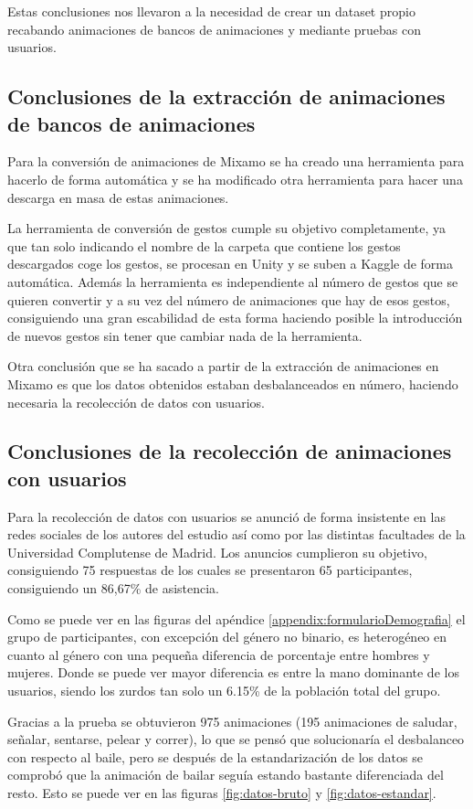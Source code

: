 Estas conclusiones nos llevaron a la necesidad de crear un dataset propio recabando animaciones de bancos de animaciones y mediante pruebas con usuarios.

\subsection{Conclusiones de la extracción de animaciones de bancos de animaciones}
Para la conversión de animaciones de Mixamo se ha creado una herramienta para hacerlo de forma automática y se ha modificado otra herramienta para hacer una descarga en masa de estas animaciones.

La herramienta de conversión de gestos cumple su objetivo completamente, ya que tan solo indicando el nombre de la carpeta que contiene los gestos descargados coge los gestos, se procesan en Unity y se suben a Kaggle de forma automática.
Además la herramienta es independiente al número de gestos que se quieren convertir y a su vez del número de animaciones que hay de esos gestos, consiguiendo una gran escabilidad de esta forma haciendo posible la introducción de nuevos gestos sin tener que cambiar nada de la herramienta.

Otra conclusión que se ha sacado a partir de la extracción de animaciones en Mixamo es que los datos obtenidos estaban desbalanceados en número, haciendo necesaria la recolección de datos con usuarios.

\subsection{Conclusiones de la recolección de animaciones con usuarios}
Para la recolección de datos con usuarios se anunció de forma insistente en las redes sociales de los autores del estudio así como por las distintas facultades de la Universidad Complutense de Madrid.
Los anuncios cumplieron su objetivo, consiguiendo 75 respuestas de los cuales se presentaron 65 participantes, consiguiendo un 86,67\% de asistencia.

Como se puede ver en las figuras del apéndice \ref{appendix:formularioDemografia} el grupo de participantes, con excepción del género no binario, es heterogéneo en cuanto al género con una pequeña diferencia de porcentaje entre hombres y mujeres.
Donde se puede ver mayor diferencia es entre la mano dominante de los usuarios, siendo los zurdos tan solo un 6.15\% de la población total del grupo.

Gracias a la prueba se obtuvieron 975 animaciones (195 animaciones de saludar, señalar, sentarse, pelear y correr), lo que se pensó que solucionaría el desbalanceo con respecto al baile, pero se después de la estandarización de los datos se comprobó que la animación de bailar seguía estando bastante diferenciada del resto.
Esto se puede ver en las figuras \ref{fig:datos-bruto} y \ref{fig:datos-estandar}.

